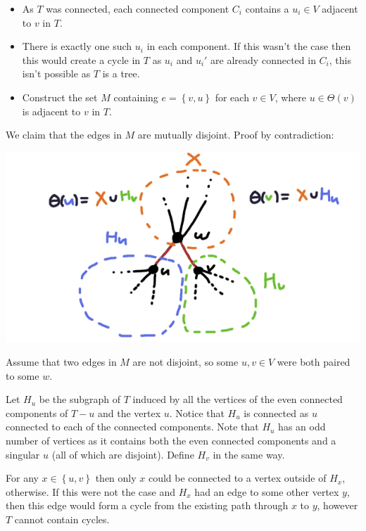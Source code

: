 \documentclass[a4paper, 11pt]{article}
\def\set#1{\left\{ #1 \right\}}
\begin{document}
\begin{multicols*}{2}
\begin{itemize}
		\item
		      As $T$ was connected, each connected component $C_i$ contains a $u_i\in V$ adjacent to $v$ in $T$.

		\item
		      There is exactly one such $u_i$ in each component. If this wasn't the case then this would create a cycle in $T$ as $u_i$ and $u_i'$ are already connected in $C_i$, this isn't possible as $T$ is a tree.

		\item
		      Construct the set $M$ containing $e=\set{v,u}$ for each $v\in V$, where $u\in\Theta(v)$ is adjacent to $v$ in $T$.
	\end{itemize}

	We claim that the edges in $M$ are mutually disjoint. Proof by contradiction:



	\begin{mdframed}
		\begin{center}
			\includegraphics[width=0.75\linewidth]{fig.png}
		\end{center}

		Assume that two edges in $M$ are not disjoint, so some $u,v\in V$ were both paired to some $w$.

		Let $H_u$ be the subgraph of $T$ induced by all the vertices of the even connected components of $T-u$ and the vertex $u$. Notice that $H_u$ is connected as $u$ connected to each of the connected components. Note that $H_u$ has an odd number of vertices as it contains both the even connected components and a singular $u$ (all of which are disjoint). Define $H_v$ in the same way.

		For any $x\in\set{u,v}$ then only $x$ could be connected to a vertex outside of $H_x$, otherwise. If this were not the case and $H_x$ had an edge to some other vertex $y$, then this edge would form a cycle from the existing path through $x$ to $y$, however $T$ cannot contain cycles.


\end{mdframed}
\end{multicols*}
\end{document}
